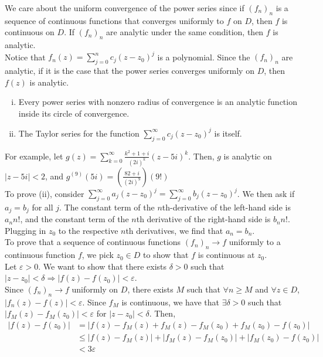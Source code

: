 \documentclass[10pt]{extarticle}
\begin{document}
  We care about the uniform convergence of the power series since if $(f_n)_n$ is a sequence of continuous functions that converges uniformly to $f$ on $D$, then $f$ is continuous on $D$. If $(f_n)_n$ are analytic under the same condition, then $f$ is analytic.\\

  Notice that $f_n(z) = \sum_{j=0}^{n}c_j(z-z_0)^j$ is a polynomial. Since the $(f_n)_n$ are analytic, if it is the case that the power series converges uniformly on $D$, then $f(z)$ is analytic.
  \begin{enumerate}[(i)]
    \item Every power series with nonzero radius of convergence is an analytic function inside its circle of convergence.
    \item The Taylor series for the function $\sum_{j=0}^{\infty}c_j(z-z_0)^j$ is itself.
  \end{enumerate}
  For example, let $g(z) = \sum_{k=0}^{\infty}\frac{k^2 + 1 + i}{(2i)^k}(z-5i)^{k}$. Then, $g$ is analytic on $|z-5i| < 2$, and $g^{(9)}(5i) = \left(\frac{82 + i}{(2i)^{9}}\right)(9!)$\\

  To prove (ii), consider $\sum_{j=0}^{\infty}a_j(z-z_0)^j = \sum_{j=0}^{\infty}b_j(z-z_0)^j$. We then ask if $a_j = b_j$ for all $j$. The constant term of the $n$th-derivative of the left-hand side is $a_nn!$, and the constant term of the $n$th derivative of the right-hand side is $b_nn!$. Plugging in $z_0$ to the respective $n$th derivatives, we find that $a_n = b_n$.\\

  To prove that a sequence of continuous functions $(f_n)_n \rightarrow f$ uniformly to a continuous function $f$, we pick $z_0\in D$ to show that $f$ is continuous at $z_0$.\\

  Let $\varepsilon > 0$. We want to show that there exists $\delta > 0$ such that $|z-z_0| < \delta \Rightarrow |f(z) - f(z_0)| < \varepsilon$.\\

  Since $(f_n)_n \rightarrow f$ uniformly on $D$, there exists $M$ such that $\forall n \geq M$ and $\forall z\in D$, $|f_n(z) - f(z)| < \varepsilon$. Since $f_M$ is continuous, we have that $\exists \delta > 0$ such that $|f_M(z) - f_M(z_0)| < \varepsilon$ for $|z-z_0| < \delta$. Then,
  \begin{align*}
    |f(z) - f(z_0)| &= |f(z) - f_M(z) + f_M(z) - f_M(z_0) + f_M(z_0) - f(z_0)|\\
                    &\leq |f(z) - f_M(z)| + |f_M(z) - f_M(z_0)| + |f_M(z_0) - f(z_0)|\\
                    &< 3\varepsilon
  \end{align*}
\end{document}
